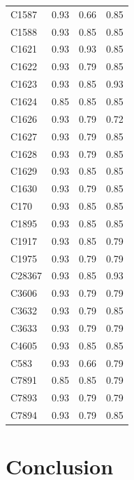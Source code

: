 \documentclass[a4paper,10pt,twoside,fleqn]{article}
\begin{document}
\begin{table}
\begin{tabular}{lrrr}
C1587     & 0.93  & 0.66  & 0.85 \\
C1588     & 0.93  & 0.85  & 0.85 \\
C1621     & 0.93  & 0.93  & 0.85 \\
C1622     & 0.93  & 0.79  & 0.85 \\
C1623     & 0.93  & 0.85  & 0.93 \\
C1624     & 0.85  & 0.85  & 0.85 \\
C1626     & 0.93  & 0.79  & 0.72 \\
C1627     & 0.93  & 0.79  & 0.85 \\
C1628     & 0.93  & 0.79  & 0.85 \\
C1629     & 0.93  & 0.85  & 0.85 \\
C1630     & 0.93  & 0.79  & 0.85 \\
C170      & 0.93  & 0.85  & 0.85 \\
C1895     & 0.93  & 0.85  & 0.85 \\
C1917     & 0.93  & 0.85  & 0.79 \\
C1975     & 0.93  & 0.79  & 0.79 \\
C28367    & 0.93  & 0.85  & 0.93 \\
C3606     & 0.93  & 0.79  & 0.79 \\
C3632     & 0.93  & 0.79  & 0.85 \\
C3633     & 0.93  & 0.79  & 0.79 \\
C4605     & 0.93  & 0.85  & 0.85 \\
C583      & 0.93  & 0.66  & 0.79 \\
C7891     & 0.85  & 0.85  & 0.79 \\
C7893     & 0.93  & 0.79  & 0.79 \\
C7894     & 0.93  & 0.79  & 0.85 \\
\bottomrule
\end{tabular}
\end{table}





\section{Conclusion}\label{sec:conclusion}









 
  
\end{document}
